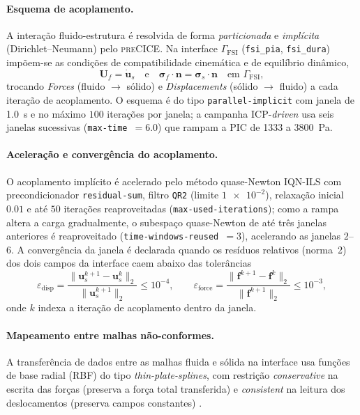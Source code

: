 \paragraph{Esquema de acoplamento.} A interação fluido-estrutura é resolvida de
forma \emph{particionada} e \emph{implícita} (Dirichlet--Neumann) pelo
\textsc{preCICE}. Na interface $\Gamma_{\mathrm{FSI}}$
(\texttt{fsi\_pia}, \texttt{fsi\_dura}) impõem-se as condições de compatibilidade
cinemática e de equilíbrio dinâmico,
\begin{equation}
  \mathbf{U}_f = \dot{\mathbf{u}}_s
  \quad\text{e}\quad
  \boldsymbol{\sigma}_f\!\cdot\!\mathbf{n} = \boldsymbol{\sigma}_s\!\cdot\!\mathbf{n}
  \quad\text{em } \Gamma_{\mathrm{FSI}},
  \label{eq:fsi-interface}
\end{equation}
trocando \emph{Forces} (fluido $\rightarrow$ sólido) e \emph{Displacements}
(sólido $\rightarrow$ fluido) a cada iteração de acoplamento. O esquema é do tipo
\texttt{parallel-implicit} com janela de \SI{1.0}{\second} e no máximo
$100$ iterações por janela; a campanha ICP-\emph{driven} usa seis janelas
sucessivas (\texttt{max-time}~$=6.0$) que rampam a PIC de \SI{1333}{} a
\SI{3800}{\pascal}.

\paragraph{Aceleração e convergência do acoplamento.} O acoplamento implícito é
acelerado pelo método quase-Newton IQN-ILS \citep{Bungartz2016} com
precondicionador \texttt{residual-sum}, filtro \texttt{QR2} (limite
$\num{1e-2}$), relaxação inicial $0.01$ e até $50$ iterações reaproveitadas
(\texttt{max-used-iterations}); como a rampa altera a carga gradualmente, o
subespaço quase-Newton de até três janelas anteriores é reaproveitado
(\texttt{time-windows-reused}~$=3$), acelerando as janelas $2$--$6$. A
convergência da janela é declarada quando os resíduos relativos (norma~2) dos
dois campos da interface caem abaixo das tolerâncias
\begin{equation}
  \varepsilon_{\mathrm{disp}}
  = \frac{\lVert \mathbf{u}_s^{k+1} - \mathbf{u}_s^{k}\rVert_2}
         {\lVert \mathbf{u}_s^{k+1}\rVert_2} \le 10^{-4},
  \qquad
  \varepsilon_{\mathrm{force}}
  = \frac{\lVert \mathbf{f}^{k+1} - \mathbf{f}^{k}\rVert_2}
         {\lVert \mathbf{f}^{k+1}\rVert_2} \le 10^{-3},
  \label{eq:fsi-conv}
\end{equation}
onde $k$ indexa a iteração de acoplamento dentro da janela.

\paragraph{Mapeamento entre malhas não-conformes.} A transferência de dados
entre as malhas fluida e sólida na interface usa funções de base radial (RBF) do
tipo \emph{thin-plate-splines}, com restrição \emph{conservative} na escrita das
forças (preserva a força total transferida) e \emph{consistent} na leitura dos
deslocamentos (preserva campos constantes) \citep{Chourdakis2022}.


